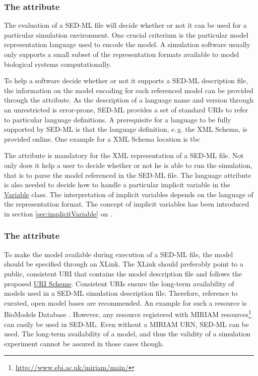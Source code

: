 \subsubsection{The  attribute}
\label{sec:language}
The evaluation of a SED-ML file will decide whether or not it can be used for a particular simulation environment. One crucial criterium is the particular model representation language used to encode the model. A simulation software usually only supports a small subset of the representation formats available to model biological systems computationally. 

To help a software decide whether or not it supports a SED-ML description file, the information on the model encoding for each referenced model can be provided through the  attribute. 
As the description of a language name and version through an unrestricted  is error-prone, SED-ML provides a set of standard URIs to refer to particular language definitions. A prerequisite for a language to be fully supported by SED-ML is that the language definition, e.\,g. the XML Schema, is provided online. One example for a XML Schema location is \alert{tbc}

The  attribute is mandatory for the XML representation of a SED-ML file. Not only does it help a user to decide whether or not he is able to run the simulation, that is to parse the model referenced in the SED-ML file. The language attribute is also needed to decide how to handle a particular implicit variable in the \hyperref[class:variable]{Variable} class. The interpretation of implicit variables depends on the language of the representation format. The concept of implicit variables has been introduced in section \ref{sec:implicitVariable} on  .


\subsubsection{The  attribute}
\label{sec:source}
To make the model available during  execution of a SED-ML file, the model  should be specified through an XLink. 
The XLink should preferably point to a public, consistent URI that contains the model description file and follows the proposed \hyperref[sec:uriScheme]{URI Scheme}.
Consistent URIs ensure the long-term availability of models used in a SED-ML simulation description file. 
Therefore, reference to curated, open model bases are recommended. An example for such a resource is BioModels Database \citep{N+06}. However, any resource registered with MIRIAM resources\footnote{\url{http://www.ebi.ac.uk/miriam/main/}} can easily be used in SED-ML. Even without a MIRIAM URN, SED-ML can be used. The long-term availability of a model, and thus the validity of a simulation experiment cannot be assured in those cases though.


